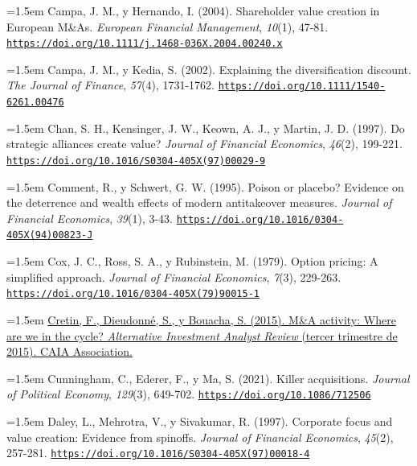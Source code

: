 \documentclass[10pt,a4paper]{article}
\begin{document}
\noindent\hangindent=1.5em Campa, J. M., y Hernando, I. (2004). Shareholder value creation in European M\&As. \textit{European Financial Management}, \textit{10}(1), 47-81. \href{https://doi.org/10.1111/j.1468-036X.2004.00240.x}{\nolinkurl{https://doi.org/10.1111/j.1468-036X.2004.00240.x}}

\noindent\hangindent=1.5em Campa, J. M., y Kedia, S. (2002). Explaining the diversification discount. \textit{The Journal of Finance}, \textit{57}(4), 1731-1762. \href{https://doi.org/10.1111/1540-6261.00476}{\nolinkurl{https://doi.org/10.1111/1540-6261.00476}}

\noindent\hangindent=1.5em Chan, S. H., Kensinger, J. W., Keown, A. J., y Martin, J. D. (1997). Do strategic alliances create value? \textit{Journal of Financial Economics}, \textit{46}(2), 199-221. \href{https://doi.org/10.1016/S0304-405X(97)00029-9}{\nolinkurl{https://doi.org/10.1016/S0304-405X(97)00029-9}}

\noindent\hangindent=1.5em Comment, R., y Schwert, G. W. (1995). Poison or placebo? Evidence on the deterrence and wealth effects of modern antitakeover measures. \textit{Journal of Financial Economics}, \textit{39}(1), 3-43. \href{https://doi.org/10.1016/0304-405X(94)00823-J}{\nolinkurl{https://doi.org/10.1016/0304-405X(94)00823-J}}

\noindent\hangindent=1.5em Cox, J. C., Ross, S. A., y Rubinstein, M. (1979). Option pricing: A simplified approach. \textit{Journal of Financial Economics}, \textit{7}(3), 229-263. \href{https://doi.org/10.1016/0304-405X(79)90015-1}{\nolinkurl{https://doi.org/10.1016/0304-405X(79)90015-1}}

\noindent\hangindent=1.5em \href{https://www.caia.org/sites/default/files/AIAR_Q3_2015-07_M\%26A_CretinDieudonneBoucha.pdf}{Cretin, F., Dieudonné, S., y Bouacha, S. (2015). M\&A activity: Where are we in the cycle? \textit{Alternative Investment Analyst Review} (tercer trimestre de 2015). CAIA Association.}

\noindent\hangindent=1.5em Cunningham, C., Ederer, F., y Ma, S. (2021). Killer acquisitions. \textit{Journal of Political Economy}, \textit{129}(3), 649-702. \href{https://doi.org/10.1086/712506}{\nolinkurl{https://doi.org/10.1086/712506}}

\noindent\hangindent=1.5em Daley, L., Mehrotra, V., y Sivakumar, R. (1997). Corporate focus and value creation: Evidence from spinoffs. \textit{Journal of Financial Economics}, \textit{45}(2), 257-281. \href{https://doi.org/10.1016/S0304-405X(97)00018-4}{\nolinkurl{https://doi.org/10.1016/S0304-405X(97)00018-4}}
\end{document}
